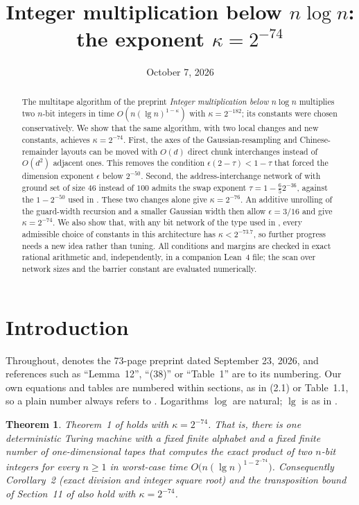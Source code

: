 \documentclass[11pt]{article}
\title{Integer multiplication below \texorpdfstring{$n\log n$}{n log n}:\\
the exponent \texorpdfstring{$\kappa=2^{-74}$}{kappa = 2\^{}-74}}
\author{}
\date{October 7, 2026}
\numberwithin{equation}{section}
\numberwithin{table}{section}
\newtheorem{theorem}{Theorem}[section]
\theoremstyle{remark}
\newcommand{\OAI}{\cite{OAI}}
\begin{document}
\maketitle

\begin{abstract}
The multitape algorithm of the preprint \emph{Integer multiplication
below $n\log n$} \OAI{} multiplies two $n$-bit integers in time
$O(n(\lg n)^{1-\kappa})$ with $\kappa=2^{-182}$; its constants were
chosen conservatively. We show that the same algorithm, with two local
changes and new constants, achieves $\kappa=2^{-74}$. First, the axes of
the Gaussian-resampling and Chinese-remainder layouts can be moved with
$O(d)$ direct chunk interchanges instead of $O(d^2)$ adjacent ones. This
removes the condition $\epsilon(2-\tau)<1-\tau$ that forced the
dimension exponent $\epsilon$ below $2^{-50}$. Second, the
address-interchange network of \OAI{} with ground set of size $46$
instead of $100$ admits the swap exponent $\tau=1-\tfrac65 2^{-36}$, against
the $1-2^{-50}$ used in \OAI. These two changes alone give
$\kappa=2^{-76}$. An additive unrolling of the guard-width recursion
and a smaller Gaussian width then allow $\epsilon=3/16$ and give
$\kappa=2^{-74}$. We also show that, with any bit network of the type
used in \OAI, every admissible choice of constants in this architecture
has $\kappa<2^{-73.7}$, so further progress needs a new idea rather than
tuning. All conditions and margins are checked in exact rational
arithmetic and, independently, in a companion Lean~4 file; the scan over
network sizes and the barrier constant are evaluated numerically.
\end{abstract}

\tableofcontents

\section{Introduction}

Throughout, \OAI{} denotes the 73-page preprint dated September 23,
2026, and references such as ``Lemma~12'', ``(38)'' or ``Table~1'' are
to its numbering. Our own equations and tables are numbered within
sections, as in (2.1) or Table~1.1, so a plain number always refers to
\OAI. Logarithms $\log$ are natural; $\lg$ is as in \OAI.

\begin{theorem}\label{thm:main}
Theorem~1 of \OAI{} holds with $\kappa=2^{-74}$. That is, there is one
deterministic Turing machine with a fixed finite alphabet and a fixed
finite number of one-dimensional tapes that computes the exact product
of two $n$-bit integers for every $n\ge1$ in worst-case time
$O\bigl(n(\lg n)^{1-2^{-74}}\bigr)$. Consequently Corollary~2 (exact
division and integer square root) and the transposition bound of
Section~11 of \OAI{} also hold with $\kappa=2^{-74}$.
\end{theorem}
\end{document}
